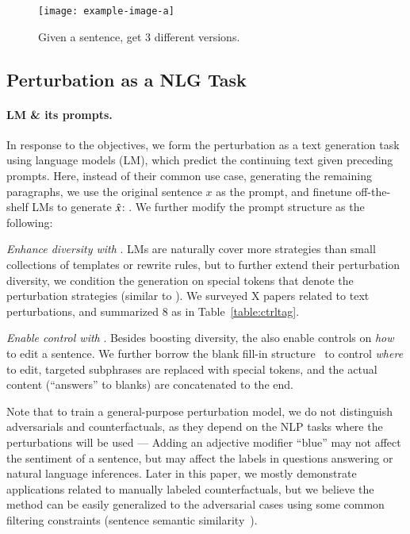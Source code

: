 \begin{figure}[t]
\centering
\texttt{[image: example-image-a]}
\vspace{-15pt}
\caption{Given a sentence, get 3 different versions.}
\vspace{-10pt}
\label{fig:blank}
\end{figure}
\subsection{Perturbation as a NLG Task}

\paragraph{LM \& its prompts.}
In response to the objectives, we form the perturbation as a text generation task using language models (LM), which predict the continuing text given preceding prompts.
Here, instead of their common use case, \ie generating the remaining paragraphs, we use the original sentence $x$ as the prompt, and finetune off-the-shelf LMs to generate $\hat{x}$: .
We further modify the prompt structure as the following:

\emph{Enhance diversity with \tagstrs}.
LMs are naturally cover more strategies than small collections of templates or rewrite rules, but to further extend their perturbation diversity, we condition the generation on special tokens that denote the perturbation strategies (similar to \citet{raffel2019exploring, Dathathri2020Plug}).
We surveyed X papers related to text perturbations, and summarized 8 \tagstrs as in Table~\ref{table:ctrltag}.

\emph{Enable control with \BLANK}.
Besides boosting diversity, the \tagstrs also enable controls on \emph{how} to edit a sentence.
We further borrow the blank fill-in structure~\cite{donahue2020enabling} to control \emph{where} to edit, \ie targeted subphrases are replaced with special \BLANK tokens, and the actual content (``answers'' to blanks) are concatenated to the end. 

Note that to train a general-purpose perturbation model, we do not distinguish adversarials and counterfactuals, as they depend on the NLP tasks where the perturbations will be used --- Adding an adjective modifier ``blue'' may not affect the sentiment of a sentence, but may affect the labels in questions answering or natural language inferences.
Later in this paper, we mostly demonstrate applications related to manually labeled counterfactuals, but we believe the method can be easily generalized to the adversarial cases using some common filtering constraints (\eg sentence semantic similarity~\cite{morris2020textattack}).


